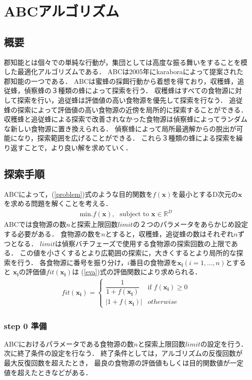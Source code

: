 \section{ABCアルゴリズム}
\subsection{概要}
郡知能とは個々での単純な行動が，集団としては高度な振る舞いをすることを模した最適化アルゴリズムである．
ABCは2005年にkaraboraによって提案された郡知能の一つである\cite{abc}．
ABCは蜜蜂の採餌行動から着想を得ており，収穫蜂，追従蜂，偵察蜂の３種類の蜂によって探索を行う．
収穫蜂はすべての食物源に対して探索を行い，追従蜂は評価値の高い食物源を優先して探索を行なう．
追従蜂の探索によって評価値の高い食物源の近傍を局所的に探索することができる．
収穫蜂と追従蜂による探索で改善されなかった食物源は偵察蜂によってランダムな新しい食物源に置き換えられる．
偵察蜂によって局所最適解からの脱出が可能になり，探索範囲を広げることができる．
これら３種類の蜂による探索を繰り返すことで，より良い解を求めていく．
\subsection{探索手順}
ABCによって，(\ref{problem})式のような目的関数を$f(\boldsymbol{x})$を最小とするD次元の$\boldsymbol{x}$を求める問題を解くことを考える．
\begin{align}
    \label{problem}
\text{min}.f(\boldsymbol{x}), \text{~~subject to } \boldsymbol{x} \in \mathbb{R} ^D
\end{align}
ABCでは食物源の数$n$と探索上限回数$limit$の２つのパラメータをあらかじめ設定する必要がある．
食物源の数を$n$とすると，収穫蜂，追従蜂の数はそれぞれ$n$ずつとなる．
$limit$は偵察バチフェーズで使用する食物源の探索回数の上限である．
この値を小さくするとより広範囲の探索に，大きくするとより局所的な探索を行う．
各食物源に番号を振り分け，$i$番目の食物源を$\boldsymbol{x_{i}}(i = 1,...,n)$とすると
$\boldsymbol{x_{i}}$の評価値$fit(\boldsymbol{x_{i}})$は
(\ref{eva})式の評価関数により求められる．
\begin{align}
    \label{eva} 
    fit(\boldsymbol{x_{i}}) =
    \begin{cases}
    \dfrac{1}{1+f(\boldsymbol{x_{i}})} & \text{if } f(\boldsymbol{x_{i}}) \geq 0   \\
    \left\lvert1+f(\boldsymbol{x_{i}})\right\rvert & otherwise
    \end{cases}
\end{align}
\subsubsection*{step 0 準備}
ABCにおけるパラメータである食物源の数$n$と探索上限回数$limit$の設定を行う．次に終了条件の設定を行なう．
終了条件としては，アルゴリズムの反復回数が最大反復回数を超えたとき，
最良の食物源の評価値もしくは目的関数値が一定値を超えたときなどがある．
